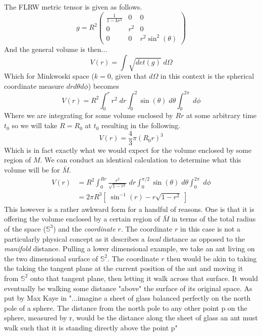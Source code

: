 \documentclass[a4paper]{article}
\begin{document}
    The FLRW metric tensor is given as
    follows.
    \[
        g = 
        R^2
        \begin{pmatrix}
            \frac{1}{1-kr^2}  & 0 & 0 \\
            0 & r^2 & 0 \\
            0 & 0 & r^2\sin^2(\theta)
        \end{pmatrix}
    \]
    And the general volume is then...
    \[
        V(r) = \int{ \sqrt{det(g)}\; d\Omega}
    \]
    Which for Minkwoski space ($k = 0$, given that $d\Omega$ in this context is
    the spherical coordinate measure $dr d\theta d\phi$) becomes
    \[
        V(r) = R^2 \int_0^{r} r^2\;dr 
                   \int_0^{2} \sin(\theta)\;d\theta
                   \int_0^{2\pi}\;d\phi
    \]
    Where we are integrating for some volume enclosed by $Rr$ at some arbitrary
    time $t_0$ so we will take $R=R_0$ at $t_0$ resulting in the following.
    \begin{equation}
        V(r) = \frac{4}{3} \pi (R_0 r)^3
    \end{equation}
    Which is in fact exactly what we would expect for the volume enclosed by
    some region of $M$. We can conduct an identical calculation to determine
    what this volume will be for $\bar{M}$.
    \begin{align*}
        V(r) &= R^2 \int_0^{Rr} \frac{r^2}{\sqrt{1-r^2}} \;dr 
                   \int_0^{\pi/2} \sin(\theta)\;d\theta
                   \int_0^{2\pi}\;d\phi         \\
             &= 2 \pi R^3 \left[\;\sin^{-1}(r) - r\sqrt{1 - r^2}\;\right]
    \end{align*}
    This however is a rather awkward form for a handful of reasons. One is that
    it is offering the volume enclosed by a certain region of $\bar{M}$ in
    terms of the total radius of the space ($\mathbb{S}^3$) and the
    \textit{coordinate} $r$. The coordinate $r$ in this case is not a
    particularly physical concept as it describes a \textit{local} distance as
    opposed to the \textit{manifold} distance. Pulling a lower dimensional
    example, we take an ant living on the two dimensional surface of
    $\mathbb{S}^2$. The coordinate $r$ then would be akin to taking the taking
    the tangent plane at the current position of the ant and moving it from
    $\mathbb{S}^2$ onto that tangent plane, then letting it walk across that
    surface. It would eventually be walking some distance "above" the surface
    of its original space. As put by Max Kaye in \cite{kaye} "...imagine a
    sheet of glass balanced perfectly on the north pole of a sphere. The
    distance from the north pole to any other point p on the sphere, measured
    by r, would be the distance along the sheet of glass an ant must walk such
    that it is standing directly above the point p"
\end{document}
